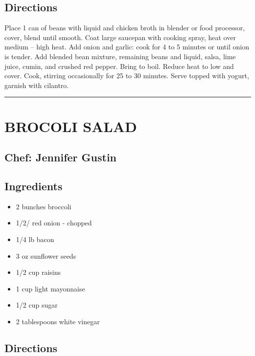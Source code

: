 \documentclass[
]{book}
\providecommand{\tightlist}{%
  \setlength{\itemsep}{0pt}\setlength{\parskip}{0pt}}
\begin{document}
\hypertarget{directions-13}{%
\subsection*{Directions}\label{directions-13}}


Place 1 can of beans with liquid and chicken broth in blender or food processor, cover, blend until smooth.
Coat large saucepan with cooking spray, heat over medium -- high heat. Add onion and garlic: cook for 4 to 5 minutes or until onion is tender.
Add blended bean mixture, remaining beans and liquid, salsa, lime juice, cumin, and crushed red pepper.
Bring to boil. Reduce heat to low and cover. Cook, stirring occasionally for 25 to 30 minutes. Serve topped with yogurt, garnish with cilantro.

\begin{center}\rule{0.5\linewidth}{0.5pt}\end{center}

\hypertarget{brocoli-salad}{%
\section*{BROCOLI SALAD}\label{brocoli-salad}}


\hypertarget{chef-jennifer-gustin-3}{%
\subsection*{Chef: Jennifer Gustin}\label{chef-jennifer-gustin-3}}


\hypertarget{ingredients-14}{%
\subsection*{Ingredients}\label{ingredients-14}}


\begin{itemize}
\tightlist
\item
  2 bunches broccoli
\item
  1/2/ red onion - chopped
\item
  1/4 lb bacon
\item
  3 oz sunflower seeds
\item
  1/2 cup raisins
\item
  1 cup light mayonnaise
\item
  1/2 cup sugar
\item
  2 tablespoons white vinegar
\end{itemize}

\hypertarget{directions-14}{%
\subsection*{Directions}\label{directions-14}}
\end{document}
